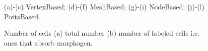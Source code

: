 \documentclass[12pt]{article}
\begin{document}
\begin{figure}
\caption{(a)-(c) VertexBased; 
(d)-(f) MeshBased; 
(g)-(i) NodeBased; 
(j)-(l) PottsBased.}
\label{fig:Monolayers}
\end{figure}


\begin{figure}
\centering
\setlength{\unitlength}{1cm}
\caption{Number of cells (a) total number (b) number of labeled cells i.e. ones that absorb morphogen.}
\label{fig:DeltaNotchStats:metrics}
\end{figure}
\end{document}
